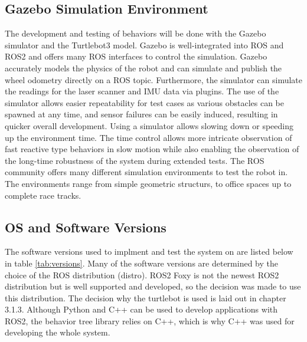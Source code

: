 \subsection{Gazebo Simulation Environment}
The development and testing of behaviors will be done with the Gazebo simulator and the Turtlebot3 model. Gazebo is well-integrated into ROS and ROS2 and offers many ROS interfaces to control the simulation. Gazebo accurately models the physics of the robot and can simulate and publish the wheel odometry directly on a ROS topic. Furthermore, the simulator can simulate the readings for the laser scanner and IMU data via plugins. The use of the simulator allows easier repeatability for test cases as various obstacles can be spawned at any time, and sensor failures can be easily induced, resulting in quicker overall development.
Using a simulator allows slowing down or speeding up the environment time. The time control allows more intricate observation of fast reactive type behaviors in slow motion while also enabling the observation of the long-time robustness of the system during extended tests. 
The ROS community offers many different simulation environments to test the robot in. The environments range from simple geometric structurs, to office spaces up to complete race tracks. 

\subsection{OS and Software Versions}
The software versions used to implment and test the system on are listed below in table \ref{tab:versions}. Many of the software versions are determined by the choice of the ROS distribution (distro). ROS2 Foxy is not the newest ROS2 distribution but is well supported and developed, so the decision was made to use this distribution. The decision why the turtlebot is used is laid out in chapter 3.1.3. Although Python and C++ can be used to develop applications with ROS2, the behavior tree library relies on C++, which is why C++ was used for developing the whole system. 

